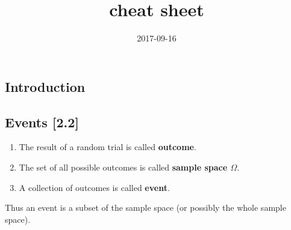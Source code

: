 \documentclass[a4paper,9pt]{extarticle}
\title{cheat sheet}
\date{2017-09-16}
\begin{document}
\begin{multicols*}{2}
\section{Introduction}
\subsection{Events [2.2]}
\begin{enumerate}[label=\bfseries (\arabic*)] \itemsep0pt \parskip0pt
    \item The result of a random trial is called \textbf{outcome}.
    \item The set of all possible outcomes is called \textbf{sample space $\Omega$}.
    \item A collection of outcomes is called \textbf{event}.
\end{enumerate}

Thus an event is a subset of the sample space (or possibly the whole sample space).

\end{multicols*}
\end{document}
